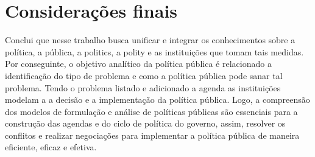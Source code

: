 \section{Considerações finais}

Conclui que nesse trabalho busca unificar e integrar os conhecimentos sobre a política, a pública, a politics, a polity e as instituições que tomam tais medidas.
Por conseguinte, o objetivo analítico da política pública é relacionado a identificação do tipo de problema e como a política pública pode sanar tal problema.
Tendo o problema listado e adicionado a agenda as instituições modelam a a decisão e a implementação da política pública.   
Logo, a compreensão dos modelos de formulação e análise de políticas públicas são essenciais para a construção das agendas e do ciclo de política do governo, assim, resolver os conflitos e realizar negociações para implementar a política pública de maneira eficiente, eficaz e efetiva.
